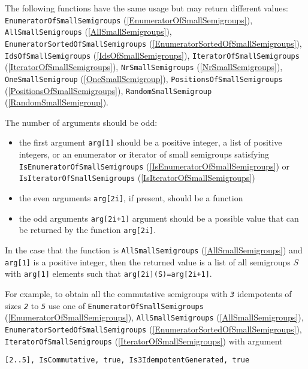 \documentclass[a4paper,11pt]{report}
\begin{document}
{{ The following functions have the same usage but may return different values: \texttt{EnumeratorOfSmallSemigroups} (\ref{EnumeratorOfSmallSemigroups}), \texttt{AllSmallSemigroups} (\ref{AllSmallSemigroups}), \texttt{EnumeratorSortedOfSmallSemigroups} (\ref{EnumeratorSortedOfSmallSemigroups}), \texttt{IdsOfSmallSemigroups} (\ref{IdsOfSmallSemigroups}), \texttt{IteratorOfSmallSemigroups} (\ref{IteratorOfSmallSemigroups}), \texttt{NrSmallSemigroups} (\ref{NrSmallSemigroups}), \texttt{OneSmallSemigroup} (\ref{OneSmallSemigroup}), \texttt{PositionsOfSmallSemigroups} (\ref{PositionsOfSmallSemigroups}), \texttt{RandomSmallSemigroup} (\ref{RandomSmallSemigroup}). 

 The number of arguments should be odd: 
\begin{itemize}
\item the first argument \texttt{arg[1]} should be a positive integer, a list of positive integers, or an enumerator or
iterator of small semigroups satisfying \texttt{IsEnumeratorOfSmallSemigroups} (\ref{IsEnumeratorOfSmallSemigroups}) or \texttt{IsIteratorOfSmallSemigroups} (\ref{IsIteratorOfSmallSemigroups})
\item  the even arguments \texttt{arg[2i]}, if present, should be a function
\item  the odd arguments \texttt{arg[2i+1]} argument should be a possible value that can be returned by the function \texttt{arg[2i]}.
\end{itemize}
 In the case that the function is \texttt{AllSmallSemigroups} (\ref{AllSmallSemigroups}) and \texttt{arg[1]} is a positive integer, then the returned value is a list of all semigroups $S$ with \texttt{arg[1]} elements such that \texttt{arg[2i](S)=arg[2i+1]}.

 For example, to obtain all the commutative semigroups with \mbox{\texttt{\mdseries\slshape 3}} idempotents of sizes \mbox{\texttt{\mdseries\slshape 2}} to \mbox{\texttt{\mdseries\slshape 5}} use one of \texttt{EnumeratorOfSmallSemigroups} (\ref{EnumeratorOfSmallSemigroups}), \texttt{AllSmallSemigroups} (\ref{AllSmallSemigroups}), \texttt{EnumeratorSortedOfSmallSemigroups} (\ref{EnumeratorSortedOfSmallSemigroups}), \texttt{IteratorOfSmallSemigroups} (\ref{IteratorOfSmallSemigroups}) with argument 
\begin{Verbatim}[commandchars=!@|,fontsize=\small,frame=single,label=Example]
  [2..5], IsCommutative, true, Is3IdempotentGenerated, true
  	

\end{Verbatim}}}
\end{document}
